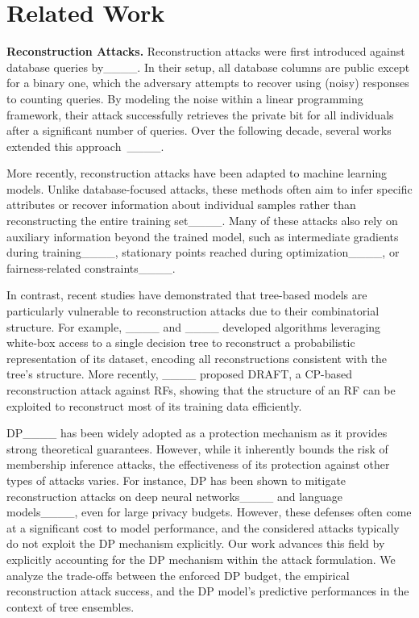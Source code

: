 \section{Related Work}
\label{sec:related_work}

\noindent
\textbf{Reconstruction Attacks.}
Reconstruction attacks were first introduced against database queries by____. In their setup, all database columns are public except for a binary one, which the adversary attempts to recover using (noisy) responses to counting queries. By modeling the noise within a linear programming framework, their attack successfully retrieves the private bit for all individuals after a significant number of queries. Over the following decade, several works extended this approach~\mbox{____}.


More recently, reconstruction attacks have been adapted to machine learning models. Unlike database-focused attacks, these methods often aim to infer specific attributes or recover information about individual samples rather than reconstructing the entire training set____. Many of these attacks also rely on auxiliary information beyond the trained model, such as intermediate gradients during training____, stationary points reached during optimization____, or fairness-related constraints____.

In contrast, recent studies have demonstrated that tree-based models are particularly vulnerable to reconstruction attacks due to their combinatorial structure. For example, ____ and ____ developed algorithms leveraging white-box access to a single decision tree to reconstruct a probabilistic representation of its dataset, encoding all reconstructions consistent with the tree's structure. More recently, ____ proposed DRAFT, a CP-based reconstruction attack against RFs, showing that the structure of an RF can be exploited to reconstruct most of its training data efficiently.

DP____ has been widely adopted as a protection mechanism as it provides strong theoretical guarantees. 
However, while it inherently bounds the risk of membership inference attacks, the effectiveness of its protection against other types of attacks varies. 
For instance, DP has been shown to mitigate reconstruction attacks on deep neural networks____ and language models____, even for large privacy budgets.
However, these defenses often come at a significant cost to model performance, and the considered attacks typically do not exploit the DP mechanism explicitly.
Our work advances this field by explicitly accounting for the DP mechanism within the attack formulation. We analyze the trade-offs between the enforced DP budget, the empirical reconstruction attack success, and the DP model's predictive performances in the context of tree ensembles.

